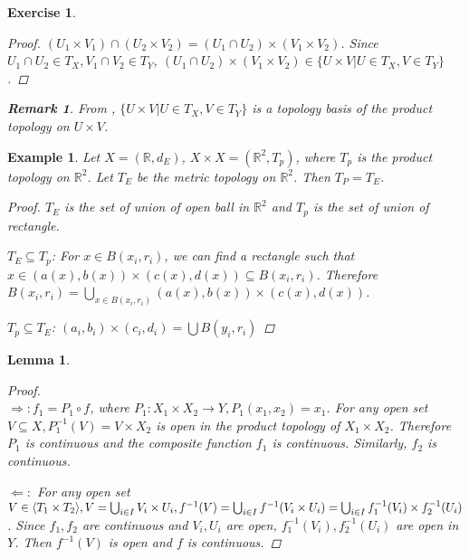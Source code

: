 \documentclass{article}
\DeclarePairedDelimiter\inner{\langle}{\rangle}
\newtheorem{example}{Example}[section] %
\newtheorem{exercise}{Exercise}[section]
\newtheorem{lemma}{Lemma}[section]
\newtheorem{remark}{Remark}[section]
\begin{document}
\setcounter{exercise}{5}
\setcounter{remark}{5}
\begin{exercise}\label{ex:45}
\begin{proof}
$(U_1\times V_1)\cap (U_2 \times V_2) = (U_1\cap U_2)\times (V_1\times V_2)$. Since $U_1\cap U_2\in T_X, V_1\cap V_2 \in T_Y$, $(U_1\cap U_2)\times (V_1\times V_2) \in \{U\times V| U\in T_X,V\in T_Y\}$.
\end{proof}
\begin{remark}
From , $\{U\times V| U\in T_X,V\in T_Y\}$ is a topology basis of the product topology on $U\times V$.
\end{remark}
\end{exercise}
\setcounter{example}{5}
\begin{example}
Let $X=(\mathbb{R},d_E)$, $X\times X =(\mathbb{R}^2,T_p)$, where $T_p$ is the product topology on $\mathbb{R}^2$. Let $T_E$ be the metric topology on $\mathbb{R}^2$. Then $T_P=T_E$.
\begin{proof}
$T_E$ is the set of union of open ball in $\mathbb{R}^2$ and $T_p$ is the set of union of rectangle. 

$T_E\subseteq T_p$: For $x\in B(x_i,r_i)$, we can find a rectangle such that $x\in (a(x),b(x))\times (c(x),d(x))\subseteq B(x_i,r_i)$. Therefore $B(x_i,r_i)=\bigcup_{x\in B(x_i,r_i)}(a(x),b(x))\times (c(x),d(x))$.

$T_p\subseteq T_E$: $(a_i,b_i)\times (c_i,d_i)=\bigcup B(y_i,r_i)$
\end{proof}
\end{example}
\setcounter{lemma}{6}
\begin{lemma}
\begin{proof}
\quad\\
\indent $\Rightarrow: f_1=P_1\circ f$, where $P_1:X_1\times X_2\to Y,P_1(x_1,x_2)=x_1$. For any open set $V\subseteq X, P_1^{-1}(V)=V\times X_2$ is open in the product topology of $X_1\times X_2$. Therefore $P_1$ is continuous and the composite function $f_1$ is continuous. Similarly, $f_2$ is continuous.

$\Leftarrow:$ For any open set $V\in \inner{T_1\times T_2},V=\bigcup_{i\in I} V_i\times U_i,f^{-1}(V)=\bigcup_{i\in I}f^{-1}(V_i\times U_i)=\bigcup_{i\in I}f_1^{-1}(V_i)\times f_2^{-1}(U_i)$. Since $f_1,f_2$ are continuous and $V_i,U_i$ are open, $f_1^{-1}(V_i),f_2^{-1}(U_i)$ are open in $Y$. Then $f^{-1}(V)$ is open and $f$ is continuous. 
\end{proof}
\end{lemma}
\end{document}

